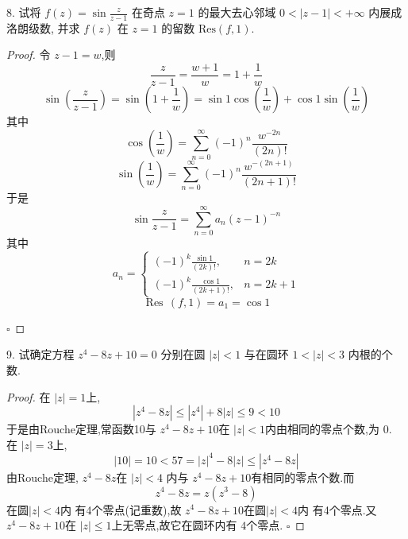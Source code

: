 \documentclass[../../复变函数.tex]{subfiles}
\begin{document}
\begin{problem}
8. 试将 $f(z) = \sin \frac{z}{z-1}$ 在奇点 $z=1$ 的最大去心邻域 $0 < |z-1| < +\infty$ 内展成洛朗级数, 并求 $f(z)$ 在 $z=1$ 的留数 $\text{Res}(f, 1)$.
\end{problem}

\begin{proof}
    令 \(  z-1  = w\),则 \[
    \frac{z }{z-1 }= \frac{w+ 1 }{w }= 1+ \frac{1 }{w }   
    \]  \[
    \sin \left( \frac{z }{z-1 }  \right) = \sin \left( 1+ \frac{1 }{w }  \right)= \sin 1\cos \left( \frac{1 }{w }  \right)+ \cos 1 \sin \left( \frac{1 }{w }  \right)   
    \]其中 \[
    \cos \left( \frac{1 }{w }  \right)= \sum _{n = 0}^{\infty}\left( -1 \right)^{n}\frac{w^{-2n} }{\left( 2n \right)!  }   
    \] \[
    \sin \left( \frac{1 }{w }  \right)= \sum _{n = 0}^{\infty} \left( -1 \right)^{n} \frac{w^{-\left( 2n+ 1 \right) } }{\left( 2n+ 1 \right)  !}   
    \]于是 \[
    \sin \frac{z }{z-1 }= \sum _{n = 0}^{\infty}a_{n}\left( z-1 \right)^{-n} 
    \]其中 \[
    a_{n}= \begin{cases} \left( -1 \right)^{k}\frac{\sin 1 }{\left( 2k \right)  !},&  n = 2k\\ 
     \left( -1 \right)^{k} \frac{\cos 1 }{\left( 2k+ 1 \right)!  },& n = 2k+ 1     \end{cases} 
    \] \[
    \operatorname{Res}\,\left( f,1 \right)= a_{1}=  \cos 1
    \]

    \hfill $\square$
\end{proof}
\begin{problem}
9. 试确定方程 $z^4 - 8z + 10 = 0$ 分别在圆 $|z|<1$ 与在圆环 $1<|z|<3$ 内根的个数.
\end{problem}
\begin{proof}
    在 \(  \left| z \right|= 1   \)上, \[
    \left| z^{4}-8z \right| \le \left| z^{4} \right|+ 8\left| z \right|\le 9< 10  
    \] 于是由Rouche定理,常函数10与 \(  z^{4}-8z+ 10  \)在 \(  \left| z \right|< 1   \)内由相同的零点个数,为 \(  0  \).
    在 \(  \left| z \right|= 3   \)上, \[
    \left| 10 \right|= 10< 57  = \left| z \right|^{4}-8\left| z \right|  \le  \left| z^{4}-8z \right|  
    \]    由Rouche定理, \(  z^{4}-8z  \)在 \(  \left| z \right|< 4   \) 内与 \(  z^{4}-8z+ 10  \)有相同的零点个数.而 \[
    z^{4}-8z= z\left( z^{3}-8 \right) 
    \]  在圆\(  \left| z \right|< 4   \)内 有4个零点(记重数),故 \(  z^{4}-8z+ 10  \)在圆\(  \left| z \right|< 4   \)内 有4个零点.又 \(  z^{4}-8z+ 10  \)在 \(  \left| z \right|\le 1   \)上无零点,故它在圆环内有 \(  4  \)个零点.   
    \hfill $\square$
\end{proof}
\end{document}
